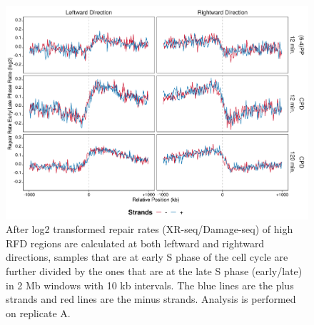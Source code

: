 \begin{figure}[H]
    \begin{center}
    \includegraphics[width=\textwidth]{Chapters/7_appendix/figures/supfig72}
    \caption[Repair rate early/late ratio of high RFDs in 2 Mb (replicate A).]{After log2 transformed repair rates (XR-seq/Damage-seq) of high RFD regions are calculated at both leftward and rightward directions, samples that are at early S phase of the cell cycle are further divided by the ones that are at the late S phase (early/late) in 2 Mb windows with 10 kb intervals. The blue lines are the plus strands and red lines are the minus strands. Analysis is performed on replicate A.}
    \label{supfig:rrel2000rfdA}
    \end{center}
    \end{figure}

